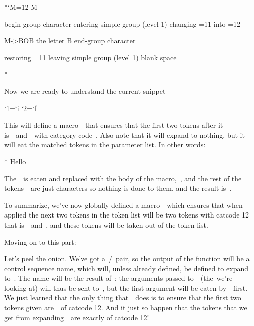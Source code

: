 {{\starttyping
*{\catcode`M=12 \bob M}
{begin-group character {}
{entering simple group (level 1)}
{\catcode}
{changing =11}
{into =12}

\bob M->BOB
{the letter B}
{end-group character }}
{restoring =11}
{leaving simple group (level 1)}
{blank space  }

*
\stoptyping

Now we are ready to understand the current snippet

\starttyping
{\uccode`1=`i \uccode`2=`f \uppercase{\gdef\if@12{}}} %
\stoptyping

This will define a macro~\type{\if@}~that ensures that the first two
tokens after it is~~and~~with category code~.
Also note that it will expand to nothing, but it will eat the matched
tokens in the parameter list. In other words:

\starttyping
*\def\eat h{H} 
Hello
\stoptyping

The~~is eaten and replaced with the body of the macro,~,
and the rest of the tokens~~are just characters so nothing is
done to them, and the result is~.

To summarize, we've now globally defined a macro~~which
ensures that when applied the next two tokens in the token list will be
two tokens with catcode 12 that is~~and~, and these
tokens will be taken out of the token list.

\stopsectionlevel

\stopsectionlevel

\startsectionlevel[title={The
Middle~\type{\def}},reference={the-middle-def}]

Moving on to this part:

\starttyping
\def\@if#1#2{\csname\expandafter\if@\string#1#2\endcsname}
\stoptyping

Let's peel the onion. We've got a~/~pair,
so the output of the function will be a control sequence name, which
will, unless already defined, be defined to expand to~\type{\relax}. The
name will be the result of~\type{\expandafter\if@\string#1#2}; the
arguments passed to~\type{\@if}~(the~we're looking at) will
thus be sent to~\type{\if@}, but the first argument will be eaten
by~\type{\string}~first. We just learned that the only thing
that~\type{\if@}~does is to ensure that the first two tokens given
are~~of catcode 12. And it just so happen that the tokens that
we get from expanding~\type{\string}~are exactly of catcode 12!

}}

